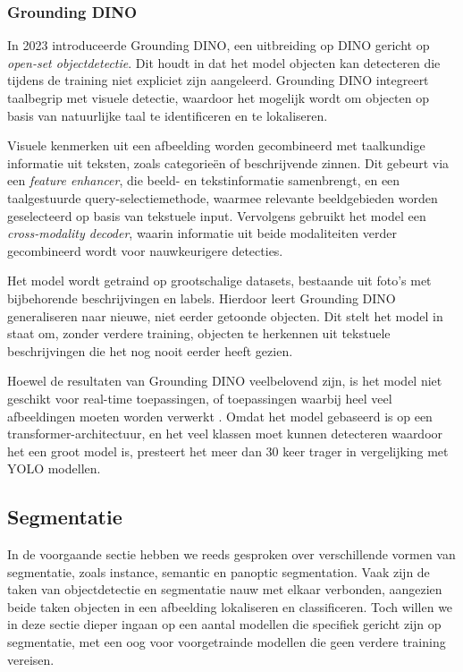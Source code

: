 \subsubsection{Grounding DINO}

In 2023 introduceerde \textcite{Liu2023} Grounding DINO, een uitbreiding op DINO gericht op \textit{open-set objectdetectie}. Dit houdt in dat het model objecten kan detecteren die tijdens de training niet expliciet zijn aangeleerd. 
Grounding DINO integreert taalbegrip met visuele detectie, waardoor het mogelijk wordt om objecten op basis van natuurlijke taal te identificeren en te lokaliseren.
\newline \par
Visuele kenmerken uit een afbeelding worden gecombineerd met taalkundige informatie uit teksten, zoals categorieën of beschrijvende zinnen. 
Dit gebeurt via een \textit{feature enhancer}, die beeld- en tekstinformatie samenbrengt, en een taalgestuurde query-selectiemethode, waarmee relevante beeldgebieden worden geselecteerd op basis van tekstuele input. 
Vervolgens gebruikt het model een \textit{cross-modality decoder}, waarin informatie uit beide modaliteiten verder gecombineerd wordt voor nauwkeurigere detecties.
\newline \par
Het model wordt getraind op grootschalige datasets, bestaande uit foto's met bijbehorende beschrijvingen en labels. 
Hierdoor leert Grounding DINO generaliseren naar nieuwe, niet eerder getoonde objecten. Dit stelt het model in staat om, zonder verdere training, objecten te herkennen uit tekstuele beschrijvingen die het nog nooit eerder heeft gezien.
\newline \par
Hoewel de resultaten van Grounding DINO veelbelovend zijn, is het model niet geschikt voor real-time toepassingen, of toepassingen waarbij heel veel afbeeldingen moeten worden verwerkt \autocite{Son2024}.
Omdat het model gebaseerd is op een transformer-architectuur, en het veel klassen moet kunnen detecteren waardoor het een groot model is, presteert het meer dan 30 keer trager in vergelijking met YOLO modellen.

\subsection{Segmentatie}

In de voorgaande sectie hebben we reeds gesproken over verschillende vormen van segmentatie, zoals instance, semantic en panoptic segmentation.
Vaak zijn de taken van objectdetectie en segmentatie nauw met elkaar verbonden, aangezien beide taken objecten in een afbeelding lokaliseren en classificeren.
Toch willen we in deze sectie dieper ingaan op een aantal modellen die specifiek gericht zijn op segmentatie, met een oog voor voorgetrainde modellen die geen verdere training vereisen.


